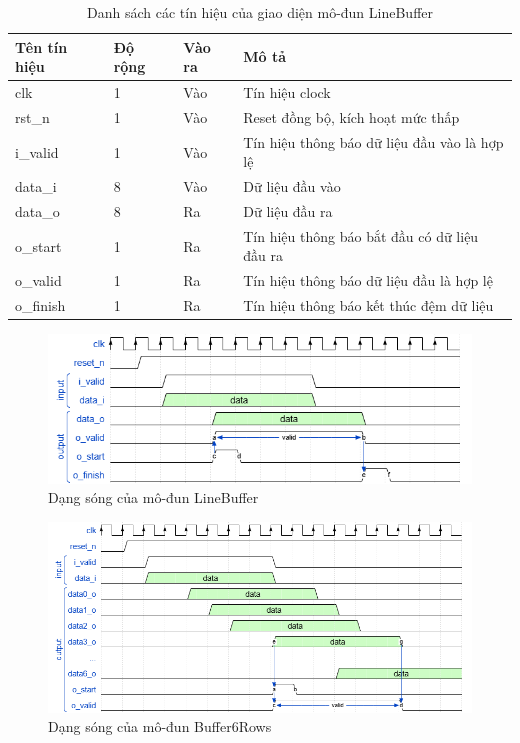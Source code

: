 \begin{table}[h]
    \centering
    \renewcommand{\arraystretch}{1.3} %
        \caption{Danh sách các tín hiệu của giao diện mô-đun LineBuffer}
    \begin{tabular}{|p{3cm} p{2cm} p{2cm} p{8cm}|}
        \hline
        \rowcolor{gray!30}
        \textbf{Tên tín hiệu} & \textbf{Độ rộng} & \textbf{Vào ra} & \textbf{Mô tả} \\
        \hline
        clk & 1 & Vào & Tín hiệu clock \\
        \hline
        rst\_n & 1 & Vào & Reset đồng bộ, kích hoạt mức thấp \\
        \hline
        i\_valid & 1 & Vào & Tín hiệu thông báo dữ liệu đầu vào là hợp lệ
        \\ \hline
        data\_i & 8 & Vào & Dữ liệu đầu vào
        \\ \hline
        data\_o & 8 & Ra & Dữ liệu đầu ra
        \\ \hline
        o\_start & 1& Ra & Tín hiệu thông báo bắt đầu có dữ liệu đầu ra
        \\ \hline
        o\_valid & 1& Ra & Tín hiệu thông báo dữ liệu đầu là hợp lệ
        \\ \hline
        o\_finish & 1 & Ra & Tín hiệu thông báo kết thúc đệm dữ liệu        
        \\ \hline
    \end{tabular}

    \label{tab:signalListLineBuffer}
\end{table}
\begin{figure}[!ht]
    \centering
    \includegraphics[width=1\linewidth]{figures/lineBuffer.png}
    \caption{Dạng sóng của mô-đun LineBuffer}
    \label{fig:lineBuffer}
\end{figure}
\begin{figure}[H]
    \centering
    \includegraphics[width=1\linewidth]{figures/Buffer6Rows.png}
    \caption{Dạng sóng của mô-đun Buffer6Rows}
    \label{fig:Buffer6Rows}
\end{figure}

